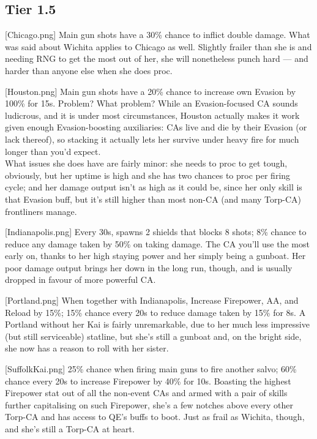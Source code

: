  
\newpage
\subsection{Tier 1.5}
[Chicago.png]
{Main gun shots have a 30\% chance to inflict double damage.}
{}
{What was said about Wichita applies to Chicago as well. Slightly frailer than she is and needing RNG to get the most out of her, she will nonetheless punch hard --- and harder than anyone else when she does proc.}

[Houston.png]
{Main gun shots have a 20\% chance to increase own Evasion by 100\% for 15s.}
{Problem? What problem?}
{While an Evasion-focused CA sounds ludicrous, and it is under most circumstances, Houston actually makes it work given enough Evasion-boosting auxiliaries: CAs live and die by their Evasion (or lack thereof), so stacking it actually lets her survive under heavy fire for much longer than you'd expect. \\
What issues she does have are fairly minor: she needs to proc to get tough, obviously, but her uptime is high and she has two chances to proc per firing cycle; and her damage output isn't as high as it could be, since her only skill is that Evasion buff, but it's still higher than most non-CA (and many Torp-CA) frontliners manage.}

[Indianapolis.png]
{Every 30s, spawns 2 shields that blocks 8 shots; 8\% chance to reduce any damage taken by 50\% on taking damage.}
{}
{The CA you'll use the most early on, thanks to her high staying power and her simply being a gunboat. Her poor damage output brings her down in the long run, though, and is usually dropped in favour of more powerful CA.}

[Portland.png]
{When together with Indianapolis, Increase Firepower, AA, and Reload by 15\%; 15\% chance every 20s to reduce damage taken by 15\% for 8s.}
{}
{A Portland without her Kai is fairly unremarkable, due to her much less impressive (but still serviceable) statline, but she's still a gunboat and, on the bright side, she now has a reason to roll with her sister.}

[SuffolkKai.png]
{25\% chance when firing main guns to fire another salvo; 60\% chance every 20s to increase Firepower by 40\% for 10s.}
{}
{Boasting the highest Firepower stat out of all the non-event CAs and armed with a pair of skills further capitalising on such Firepower, she's a few notches above every other Torp-CA and has access to QE's buffs to boot. Just as frail as Wichita, though, and she's still a Torp-CA at heart.}

